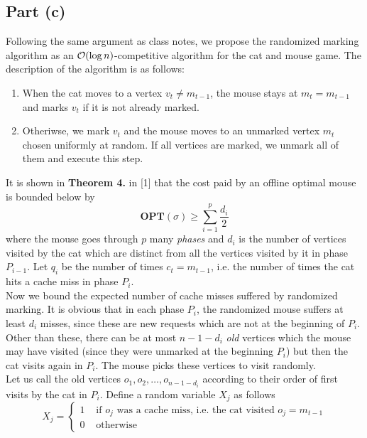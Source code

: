 \documentclass[11pt]{article}
\newcommand{\bigO}{{\cal O}}
\begin{document}
\subsection*{Part (c)}
Following the same argument as class notes, we propose the randomized marking
algorithm as an $\bigO(\log{n})$-competitive algorithm for the cat and mouse game.
The description of the algorithm is as follows:
\begin{enumerate}
    \item When the cat moves to a vertex $v_{t} \neq m_{t-1}$, the mouse stays at
    $m_{t} = m_{t-1}$ and marks $v_{t}$ if it is not already marked.
    \item Otheriwse, we mark $v_{t}$ and the mouse moves to an unmarked vertex $m_{t}$
    chosen uniformly at random. If all vertices are marked, we unmark all of them
    and execute this step.
\end{enumerate}
It is shown in \textbf{Theorem 4.} in [1] that the cost paid by an offline optimal
mouse is bounded below by
\begin{equation}
    \label{eq:opt-mouse}
    \mathbf{OPT}(\sigma) \geq \sum_{i=1}^{p} \frac{d_{i}}{2}
\end{equation}
where the mouse goes through $p$ many \textit{phases} and $d_{i}$ is the number of
vertices visited by the cat which are distinct from all the vertices visited by it in phase
$P_{i-1}$. Let $q_{i}$ be the number of times $c_{t} = m_{t-1}$, i.e.
the number of times the cat hits a cache miss in phase $P_{i}$. \\
Now we bound the expected number of cache misses suffered by randomized marking. It
is obvious that in each phase $P_{i}$, the randomized mouse suffers at least $d_{i}$
misses, since these are new requests which are not  at the beginning
of $P_{i}$. Other than these, there can be at most $n-1-d_{i}$ \textit{old} vertices
which the mouse may have visited (since they were unmarked at the beginning $P_{i}$)
but then the cat visits again in $P_{i}$. The mouse picks these vertices to visit randomly. \\
Let us call the old vertices $o_{1}, o_{2}, \ldots, o_{n-1-d_{i}}$ according to their order
of first visits by the cat in $P_{i}$. Define a random variable $X_{j}$ as follows
\begin{equation}
    X_{j} = \begin{cases}
        1 & \text{ if } o_{j} \text{ was a cache miss, i.e. the cat visited } o_{j} = m_{t-1} \\
        0 & \text{ otherwise}
    \end{cases}
\end{equation}
\end{document}
